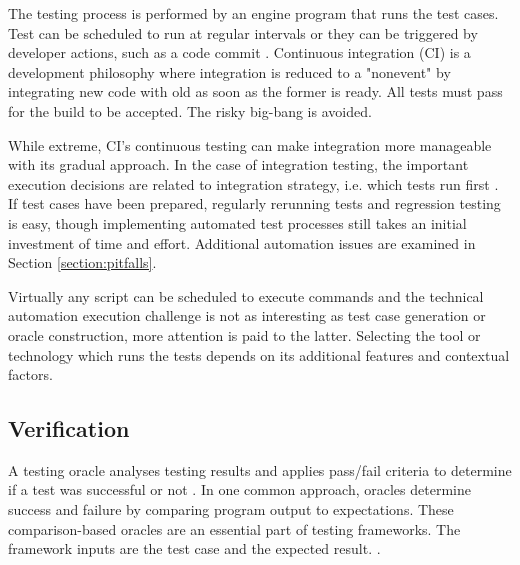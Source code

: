 \documentclass[12pt,a4paper,oneside,pdftex]{report}
\begin{document}
The testing process is performed by an engine program that runs the test cases. Test can be scheduled to run at regular intervals or they can be triggered by developer actions, such as a code commit \citep{pezze2008software}. Continuous integration (CI) is a development philosophy where integration is reduced to a "nonevent" by integrating new code with old as soon as the former is ready. All tests must pass for the build to be accepted. \citep{duvall2007continuous} The risky big-bang is avoided.

While extreme, CI's continuous testing can make integration more manageable with its gradual approach. In the case of integration testing, the important execution decisions are related to integration strategy, i.e. which tests run first \citep{duvall2007continuous}. If test cases have been prepared, regularly rerunning tests and regression testing is easy, though implementing automated test processes still takes an initial investment of time and effort. Additional automation issues are examined in Section \ref{section:pitfalls}.

Virtually any script can be scheduled to execute commands and the technical automation execution challenge is not as interesting as test case generation or oracle construction, more attention is paid to the latter. Selecting the tool or technology which runs the tests depends on its additional features and contextual factors.


\subsection{Verification}
A testing oracle analyses testing results and applies pass/fail criteria to determine if a test was successful or not \citep{pezze2008software, burnstein2003practical}. In one common approach, oracles determine success and failure by comparing program output to expectations. These comparison-based oracles are an essential part of testing frameworks. The framework inputs are the test case and the expected result. \citep{pezze2008software}. 
\end{document}
